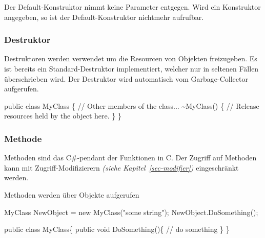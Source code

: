 \documentclass[
  9pt,
  a4paperpaper,
  DIV=11]{scrartcl}
\newenvironment{Shaded}{}{}
\newcommand{\CommentTok}[1]{\textcolor[rgb]{0.42,0.45,0.49}{#1}}
\newcommand{\DataTypeTok}[1]{\textcolor[rgb]{0.84,0.23,0.29}{#1}}
\newcommand{\FunctionTok}[1]{\textcolor[rgb]{0.44,0.26,0.76}{#1}}
\newcommand{\KeywordTok}[1]{\textcolor[rgb]{0.84,0.23,0.29}{#1}}
\newcommand{\NormalTok}[1]{\textcolor[rgb]{0.14,0.16,0.18}{#1}}
\newcommand{\OperatorTok}[1]{\textcolor[rgb]{0.14,0.16,0.18}{#1}}
\newcommand{\StringTok}[1]{\textcolor[rgb]{0.01,0.18,0.38}{#1}}
\numberwithin{equation}{section}
\begin{document}
\begin{multicols}{2}
\begin{tcolorbox}
\begin{tcolorbox}
\begin{tcolorbox}
Der Default-Konstruktor nimmt keine Parameter entgegen. Wird ein
Konstruktor angegeben, so ist der Default-Konstruktor nichtmehr
aufrufbar.

\end{tcolorbox}

\hypertarget{destruktor}{%
\subsubsection{Destruktor}\label{destruktor}}

Destruktoren werden verwendet um die Resourcen von Objekten freizugeben.
Es ist bereits ein Standard-Destruktor implementiert, welcher nur in
seltenen Fällen überschrieben wird. Der Destruktor wird automatisch vom
Garbage-Collector aufgerufen.

\begin{Shaded}
\begin{Highlighting}[]
\KeywordTok{public} \KeywordTok{class}\NormalTok{ MyClass}
\OperatorTok{\{}
    \CommentTok{// Other members of the class...}
    \OperatorTok{\textasciitilde{}}\FunctionTok{MyClass}\OperatorTok{()}
    \OperatorTok{\{}
        \CommentTok{// Release resources held by the object here.}
    \OperatorTok{\}}
\OperatorTok{\}}
\end{Highlighting}
\end{Shaded}

\hypertarget{methode}{%
\subsubsection{Methode}\label{methode}}

Methoden sind das C\#-pendant der Funktionen in C. Der Zugriff auf
Methoden kann mit Zugriff-Modifizierern \emph{(siehe
Kapitel~\ref{sec-modifier})} eingeschränkt werden.

Methoden werden über Objekte aufgerufen

\begin{Shaded}
\begin{Highlighting}[]
\NormalTok{MyClass NewObject }\OperatorTok{=} \KeywordTok{new} \FunctionTok{MyClass}\OperatorTok{(}\StringTok{"some string"}\OperatorTok{);}
\NormalTok{NewObject}\OperatorTok{.}\FunctionTok{DoSomething}\OperatorTok{();}

\KeywordTok{public} \KeywordTok{class}\NormalTok{ MyClass}\OperatorTok{\{}
  \KeywordTok{public} \DataTypeTok{void} \FunctionTok{DoSomething}\OperatorTok{()\{}
    \CommentTok{// do something}
  \OperatorTok{\}}
\OperatorTok{\}}
\end{Highlighting}
\end{Shaded}


\end{tcolorbox}
\end{tcolorbox}
\end{multicols}
\end{document}
